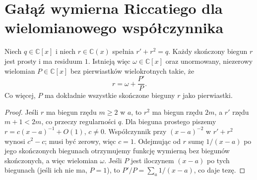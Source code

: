 \section{Gałąź wymierna Riccatiego dla wielomianowego współczynnika}

\begin{lemat}
\label{aa:lem:kovacic-rational-poles}
Niech $q\in\mathbb C[x]$
i niech $r\in\mathbb C(x)$
spełnia $r'+r^2=q$.
Każdy skończony biegun $r$
jest prosty i ma residuum $1$.
Istnieją więc
$\omega\in\mathbb C[x]$
oraz unormowany, niezerowy
wielomian $P\in\mathbb C[x]$
bez pierwiastków wielokrotnych
takie, że
\begin{equation}\label{aa:eq:kovacic-rational-r}
 r=\omega+\frac{P'}P.
\end{equation}
Co więcej, $P$ ma dokładnie
wszystkie skończone bieguny $r$
jako pierwiastki.
\end{lemat}
\begin{proof}
Jeśli $r$ ma biegun rzędu
$m\ge2$ w $a$, to $r^2$
ma biegun rzędu $2m$,
a $r'$ rzędu $m+1<2m$,
co przeczy regularności $q$.
Dla bieguna prostego piszemy
$r=c(x-a)^{-1}+O(1)$,
$c\ne0$. Współczynnik
przy $(x-a)^{-2}$ w
$r'+r^2$ wynosi
$c^2-c$; musi być zerowy,
więc $c=1$.
Odejmując od $r$
sumę $1/(x-a)$ po jego
skończonych biegunach
otrzymujemy funkcję wymierną
bez biegunów skończonych,
a więc wielomian $\omega$.
Jeśli $P$ jest iloczynem
$(x-a)$ po tych biegunach
(jeśli ich nie ma, $P=1$),
to $P'/P=\sum_a1/(x-a)$,
co daje tezę.
\end{proof}

